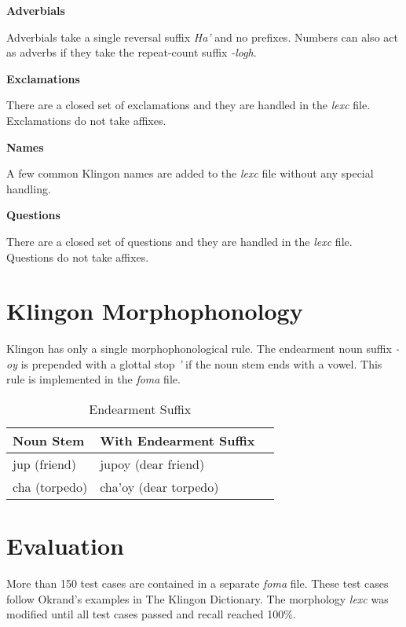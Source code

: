 \documentclass[11pt]{article}
\begin{document}
\textbf{Adverbials}

Adverbials take a single reversal suffix \textit{Ha'} and no prefixes. Numbers can also act as adverbs if they take the repeat-count suffix \textit{-logh}.

\textbf{Exclamations}

There are a closed set of exclamations and they are handled in the \textit{lexc} file. Exclamations do not take affixes.

\textbf{Names}

A few common Klingon names are added to the \textit{lexc} file without any special handling.

\textbf{Questions}

There are a closed set of questions and they are handled in the \textit{lexc} file. Questions do not take affixes.

\section{Klingon Morphophonology}

Klingon has only a single morphophonological rule. The endearment noun suffix \textit{-oy} is prepended with a glottal stop \textit{'} if the noun stem ends with a vowel. This rule is implemented in the \textit{foma} file.

	\begin{table}[h]
	\begin{center}
	\begin{tabular}{lll}
	\toprule
	\bf Noun Stem & \bf With Endearment Suffix \\
	\midrule
	jup (friend) & jupoy (dear friend) \\
	cha (torpedo) & cha'oy (dear torpedo) \\
	\bottomrule
	\end{tabular}
	\end{center}
	\caption{Endearment Suffix}
	\end{table}

\section{Evaluation}

More than 150 test cases are contained in a separate \textit{foma} file. These test cases follow Okrand's examples in The Klingon Dictionary. The morphology \textit{lexc} was modified until all test cases passed and recall reached 100\%.
\end{document}
